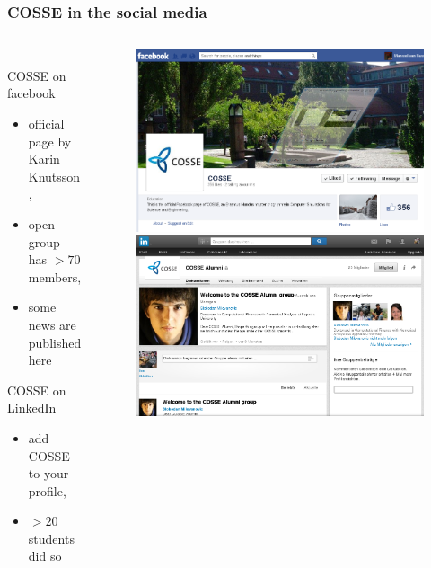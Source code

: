 \documentclass{beamer}
\begin{document}
\begin{frame}
\frametitle{COSSE in the social media}
\begin{columns}
\begin{column}{0.55\textwidth}
\vspace{-0.8cm}\\
COSSE on facebook
\begin{itemize}
 \item official page by Karin Knutsson,
 \item open group has $> 70$ members,
 \item some news are published here
\end{itemize}
\vspace{1.4cm}
COSSE on LinkedIn
\begin{itemize}
 \item add COSSE to your profile,
 \item $> 20$ students did so
\end{itemize}
\end{column}
\begin{column}{0.45\textwidth}
\begin{figure}
\centering
\includegraphics[width=\textwidth]{images/fb.png}\\
\vspace{0.5cm}
\includegraphics[width=\textwidth]{images/LinkedIn.png}
\end{figure}
\end{column}
\end{columns}

\end{frame}
\end{document}
